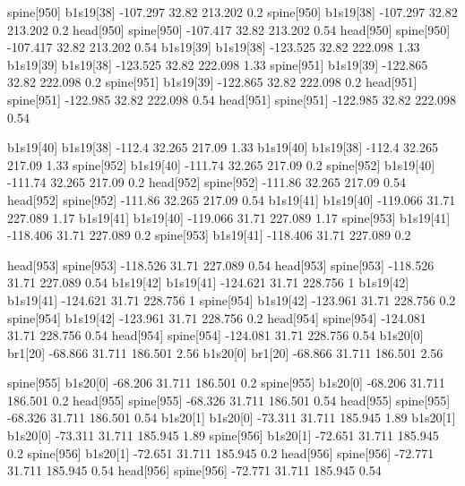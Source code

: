 spine[950]    b1s19[38]    -107.297    32.82    213.202    0.2
spine[950]    b1s19[38]    -107.297    32.82    213.202    0.2
head[950]    spine[950]    -107.417    32.82    213.202    0.54
head[950]    spine[950]    -107.417    32.82    213.202    0.54
b1s19[39]    b1s19[38]    -123.525    32.82    222.098    1.33
b1s19[39]    b1s19[38]    -123.525    32.82    222.098    1.33
spine[951]    b1s19[39]    -122.865    32.82    222.098    0.2
spine[951]    b1s19[39]    -122.865    32.82    222.098    0.2
head[951]    spine[951]    -122.985    32.82    222.098    0.54
head[951]    spine[951]    -122.985    32.82    222.098    0.54


b1s19[40]    b1s19[38]    -112.4    32.265    217.09    1.33
b1s19[40]    b1s19[38]    -112.4    32.265    217.09    1.33
spine[952]    b1s19[40]    -111.74    32.265    217.09    0.2
spine[952]    b1s19[40]    -111.74    32.265    217.09    0.2
head[952]    spine[952]    -111.86    32.265    217.09    0.54
head[952]    spine[952]    -111.86    32.265    217.09    0.54
b1s19[41]    b1s19[40]    -119.066    31.71    227.089    1.17
b1s19[41]    b1s19[40]    -119.066    31.71    227.089    1.17
spine[953]    b1s19[41]    -118.406    31.71    227.089    0.2
spine[953]    b1s19[41]    -118.406    31.71    227.089    0.2


head[953]    spine[953]    -118.526    31.71    227.089    0.54
head[953]    spine[953]    -118.526    31.71    227.089    0.54
b1s19[42]    b1s19[41]    -124.621    31.71    228.756    1
b1s19[42]    b1s19[41]    -124.621    31.71    228.756    1
spine[954]    b1s19[42]    -123.961    31.71    228.756    0.2
spine[954]    b1s19[42]    -123.961    31.71    228.756    0.2
head[954]    spine[954]    -124.081    31.71    228.756    0.54
head[954]    spine[954]    -124.081    31.71    228.756    0.54
b1s20[0]    br1[20]    -68.866    31.711    186.501    2.56
b1s20[0]    br1[20]    -68.866    31.711    186.501    2.56


spine[955]    b1s20[0]    -68.206    31.711    186.501    0.2
spine[955]    b1s20[0]    -68.206    31.711    186.501    0.2
head[955]    spine[955]    -68.326    31.711    186.501    0.54
head[955]    spine[955]    -68.326    31.711    186.501    0.54
b1s20[1]    b1s20[0]    -73.311    31.711    185.945    1.89
b1s20[1]    b1s20[0]    -73.311    31.711    185.945    1.89
spine[956]    b1s20[1]    -72.651    31.711    185.945    0.2
spine[956]    b1s20[1]    -72.651    31.711    185.945    0.2
head[956]    spine[956]    -72.771    31.711    185.945    0.54
head[956]    spine[956]    -72.771    31.711    185.945    0.54


